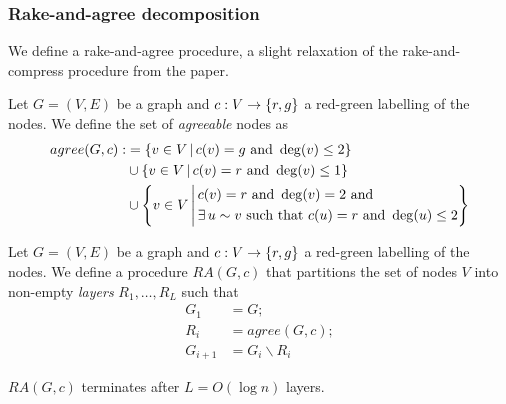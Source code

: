 \documentclass[12pt,a4paper]{article}
\begin{document}
\subsubsection{Rake-and-agree decomposition}
We define a rake-and-agree procedure, a slight relaxation of the rake-and-compress procedure from the paper.
\begin{defn}
    Let $G=(V,E)$ be a graph and $c:V\to\left\{r,g\right\}$ a red-green labelling of the nodes. We define the set of \emph{agreeable} nodes as
    \begin{align*}
        agree(G,c):&=\Set{v\in V\dv c(v)=g\sand\deg(v)\leq 2}\\
        &\cup\Set{v\in V\dv c(v)=r\sand\deg(v)\leq 1}\\
        &\cup\Set{v\in V\dv \begin{aligned}
            &c(v)=r\sand\deg(v)=2\sand\\&\exists u\sim v\text{ such that }c(u)=r\sand\deg(u)\leq 2
        \end{aligned}}
    \end{align*}
\end{defn}
\begin{defn}
    Let $G=(V,E)$ be a graph and $c:V\to\left\{r,g\right\}$ a red-green labelling of the nodes. We define a procedure $RA(G,c)$ that partitions the set of nodes $V$ into non-empty \emph{layers} $R_1,\ldots,R_L$ such that
    \begin{align*}
        G_1&=G;\\
        R_i&=agree(G,c);\\
        G_{i+1}&=G_i\smallsetminus R_i
    \end{align*}
\end{defn}
\begin{lem}\label{lem:es-decomposition}
    $RA(G,c)$ terminates after $L=O(\log n)$ layers.
\end{lem}
\end{document}
